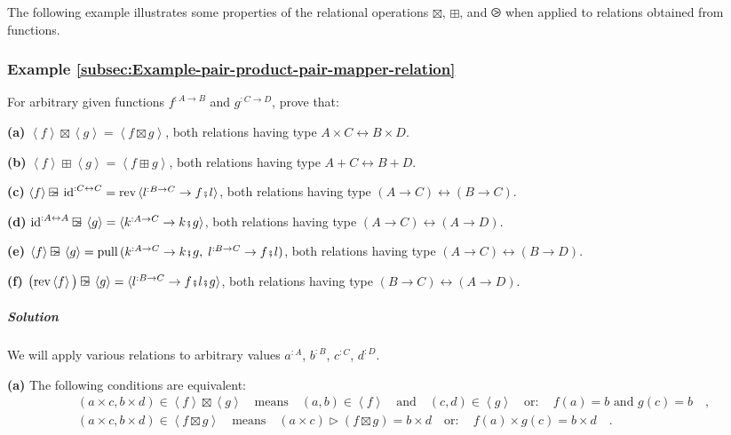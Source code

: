 The following example illustrates some properties of the relational
operations $\boxtimes$, $\boxplus$, and $\ogreaterthan$ when applied
to relations obtained from functions.

\subsubsection{Example \label{subsec:Example-pair-product-pair-mapper-relation}\ref{subsec:Example-pair-product-pair-mapper-relation}}

For arbitrary given functions $f^{:A\rightarrow B}$ and $g^{:C\rightarrow D}$,
prove that:

\textbf{(a)} $\left<f\right>\boxtimes\left<g\right>=\left<f\boxtimes g\right>$,
both relations having type $A\times C\leftrightarrow B\times D$.

\textbf{(b)} $\left<f\right>\boxplus\left<g\right>=\left<f\boxplus g\right>$,
both relations having type $A+C\leftrightarrow B+D$.

\textbf{(c)} $\left<f\right>\ogreaterthan\text{id}^{:C\leftrightarrow C}=\text{rev}\,\langle l^{:B\rightarrow C}\rightarrow f\bef l\rangle$,
both relations having type $\left(A\rightarrow C\right)\leftrightarrow\left(B\rightarrow C\right)$.

\textbf{(d)} $\text{id}^{:A\leftrightarrow A}\ogreaterthan\left<g\right>=\langle k^{:A\rightarrow C}\rightarrow k\bef g\rangle$,
both relations having type $\left(A\rightarrow C\right)\leftrightarrow\left(A\rightarrow D\right)$.

\textbf{(e)} $\left<f\right>\ogreaterthan\left<g\right>=\text{pull}\,(k^{:A\rightarrow C}\rightarrow k\bef g,\;l^{:B\rightarrow C}\rightarrow f\bef l)$,
both relations having type $\left(A\rightarrow C\right)\leftrightarrow\left(B\rightarrow D\right)$.

\textbf{(f)} $\big(\text{rev}\left<f\right>\big)\ogreaterthan\left<g\right>=\langle l^{:B\rightarrow C}\rightarrow f\bef l\bef g\rangle$,
both relations having type $\left(B\rightarrow C\right)\leftrightarrow\left(A\rightarrow D\right)$.

\subparagraph{Solution}

We will apply various relations to arbitrary values $a^{:A}$, $b^{:B}$,
$c^{:C}$, $d^{:D}$.

\textbf{(a)} The following conditions are equivalent:
\begin{align*}
 & (a\times c,b\times d)\in\left<f\right>\boxtimes\left<g\right>\quad\text{means}\quad(a,b)\in\left<f\right>\quad\text{and}\quad(c,d)\in\left<g\right>\quad\text{or}:\quad f(a)=b\text{ and }g(c)=b\quad,\\
 & (a\times c,b\times d)\in\left<f\boxtimes g\right>\quad\text{means}\quad(a\times c)\triangleright(f\boxtimes g)=b\times d\quad\text{or}:\quad f(a)\times g(c)=b\times d\quad.
\end{align*}

